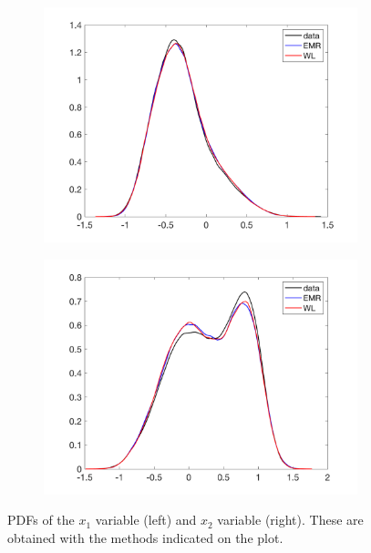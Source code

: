 \documentclass[12pt]{article}
\begin{document}
\begin{figure}[H]
	\centering
	\begin{subfigure}[b]{0.49\textwidth}
		\centering
		\includegraphics[width=\textwidth]{plots/climate_model/h01/pdfx1_e05_h01.png}
	\end{subfigure}
	\begin{subfigure}[b]{0.49\textwidth}
		\centering
		\includegraphics[width=\textwidth]{plots/climate_model/h01/pdfx2_e05_h01.png}
	\end{subfigure}
	\caption{PDFs of the $x_1$ variable (left) and $x_2$ variable (right). These are obtained with the methods indicated on the plot.}
\end{figure}
\end{document}
